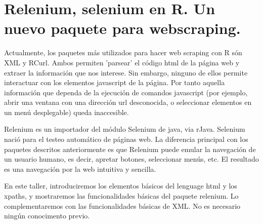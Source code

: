 \chapter{Relenium, selenium en R. Un nuevo paquete para webscraping.}




Actualmente, los paquetes más utilizados para hacer web scraping con R són XML y RCurl. Ambos permiten 'parsear' el código html de la página web y extraer la información que nos interese. Sin embargo, ninguno de ellos permite interactuar con los elementos javascript de la página. Por tanto aquella información que dependa de la ejecución de comandos javascript (por ejemplo, abrir una ventana con una dirección url desconocida, o seleccionar elementos en un menú desplegable) queda inaccesible.

Relenium es un importador del módulo Selenium de java, via rJava. Selenium nació para el testeo automático de páginas web. La diferencia principal con los paquetes descritos anteriormente es que Relenium puede emular la navegación de un usuario humano, es decir, apretar botones, seleccionar menús, etc. El resultado es una navegación por la web intuitiva y sencilla.

En este taller, introduciremos los elementos básicos del lenguage html y los xpaths, y mostraremos las funcionalidades básicas del paquete relenium. Lo complementaremos con las funcionalidades básicas de XML. No es necesario ningún conocimento previo. 



%

%
